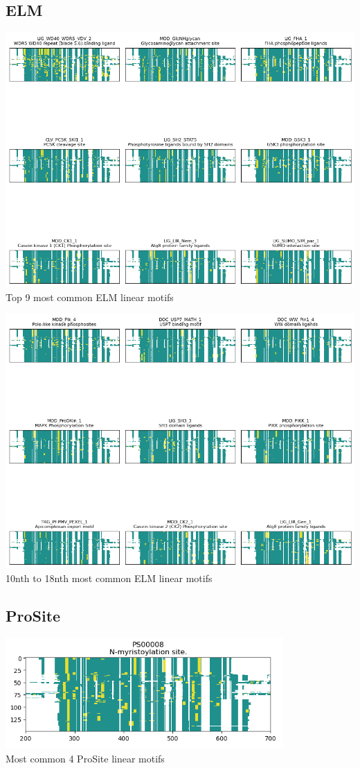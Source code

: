 \documentclass[10pt,twocolumn,letterpaper]{article}
\begin{document}
\subsection{ELM}
\begin{center}
    \includegraphics[scale=0.4]{report/img/Elm1.png} \\
    \small{Top 9 most common ELM linear motifs}
\end{center}
\begin{center}
    \includegraphics[scale=0.4]{report/img/Elm2.png} \\
    \small{10nth to 18nth most common ELM linear motifs}
\end{center}

\subsection{ProSite}
\begin{center}
    \includegraphics[scale=0.4]{report/img/Prosite.png} \\
    \small{Most common 4 ProSite linear motifs}
\end{center}
\end{document}
